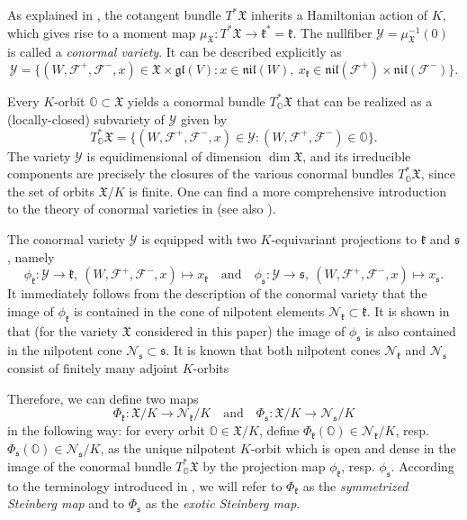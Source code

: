 \documentclass[11pt]{article}
\theoremstyle{definition}
\numberwithin{equation}{section}
\newcommand{\fk}{\mathfrak{k}}
\newcommand{\fs}{\mathfrak{s}}
\newcommand{\gl}{\mathfrak{gl}}
\newcommand{\nil}{\mathfrak{nil}}
\newcommand{\flag}{\mathcal{F}}
\newcommand{\conormal}{\mathcal{Y}}
\newcommand{\Xorbit}{\mathbb{O}}
\newcommand{\nilpotentsof}[1]{\mathcal{N}_{#1}}
\newcommand{\Xfv}{\mathfrak{X}}
\begin{document}
As explained in \cite[\S3]{FN2}, the cotangent bundle $T^*\Xfv$ inherits a Hamiltonian action of $K$, which gives rise to a moment map $\mu_\Xfv:T^*\Xfv\to\fk^*=\fk$.
The nullfiber $\conormal=\mu_\Xfv^{-1}(0)$ is called a {\em conormal variety}. It can be described explicitly as
\[
\conormal=\{(W,\flag^+,\flag^-,x)\in \Xfv\times\gl(V):x\in\nil(W),\ x_\fk\in\nil(\flag^+)\times\nil(\flag^-)\}.
\]

Every $K$-orbit $\Xorbit\subset \Xfv$ yields a conormal bundle $T^*_\Xorbit\Xfv$ that can be realized as a (locally-closed) subvariety of $\conormal$ given by
\[
T^*_\Xorbit\Xfv=\{(W,\flag^+,\flag^-,x)\in\conormal:(W,\flag^+,\flag^-)\in\Xorbit\}.
\]
The variety $\conormal$ is equidimensional of dimension $\dim\Xfv$, and its irreducible components are precisely the closures of the various conormal bundles $T^*_\Xorbit\Xfv$, since the set of orbits $\Xfv/K$ is finite.
One can find a more comprehensive introduction to the theory of conormal varieties in \cite[\S 3]{FN2} (see also \cite{CG}).

The conormal variety $\conormal$ is equipped with two $K$-equivariant projections to $\fk$ and $\fs$, namely
\[\phi_\fk:\conormal\to\fk,\ (W,\flag^+,\flag^-,x)\mapsto x_\fk\quad\mbox{and}\quad
\phi_\fs:\conormal\to\fs,\ (W,\flag^+,\flag^-,x)\mapsto x_\fs.\]
It immediately follows from the description of the conormal variety that the image of $\phi_\fk$ is contained in the cone of nilpotent elements $\nilpotentsof{\fk}\subset\fk$.
It is shown in \cite[Proposition 4.2]{FN1} that (for the variety $\Xfv$ considered in this paper) the image of $\phi_\fs$ is also contained in the nilpotent cone $\nilpotentsof{\fs}\subset\fs$.
It is known that both nilpotent cones $\nilpotentsof{\fk}$ and $\nilpotentsof{\fs}$ consist of finitely many adjoint $K$-orbits

Therefore, we can define two maps
\[\Phi_\fk:\Xfv/K\to\nilpotentsof{\fk}/K
\quad\mbox{and}\quad
\Phi_\fs:\Xfv/K\to\nilpotentsof{\fs}/K\]
in the following way: for every orbit $\Xorbit\in\Xfv/K$, define $\Phi_\fk(\Xorbit)\in \nilpotentsof{\fk}/K$, resp. $\Phi_\fs(\Xorbit)\in\nilpotentsof{\fs}/K$, as the unique nilpotent $K$-orbit which is open and dense in the image of the conormal bundle $T^*_\Xorbit\Xfv$ by the projection map $\phi_\fk$, resp. $\phi_\fs$. According to the terminology introduced in \cite{FN2}, we will refer to $\Phi_\fk$ as the {\em symmetrized Steinberg map} and to $\Phi_\fs$ as the {\em exotic Steinberg map}.
\end{document}
